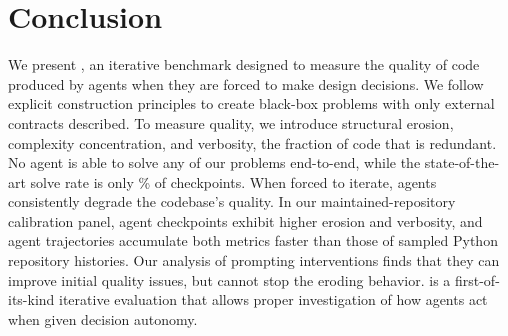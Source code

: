 \section{Conclusion}
\label{sec:conclusion}

We present \scb{}, an iterative benchmark designed to measure the quality of code produced by agents when they are forced to make design decisions. We follow explicit construction principles to create black-box problems with only external contracts described. To measure quality, we introduce structural erosion, complexity concentration, and verbosity, the fraction of code that is redundant. No agent is able to solve any of our \transProblems{} problems end-to-end, while the state-of-the-art solve rate is only \overallBestStrictSolveRate{}\% of \overallTotalCheckpoints{} checkpoints. When forced to iterate, agents consistently degrade the codebase's quality. In our maintained-repository calibration panel, agent checkpoints exhibit higher erosion and verbosity, and agent trajectories accumulate both metrics faster than those of sampled Python repository histories. Our analysis of prompting interventions finds that they can improve initial quality issues, but cannot stop the eroding behavior. \scb{} is a first-of-its-kind iterative evaluation that allows proper investigation of how agents act when given decision autonomy.
